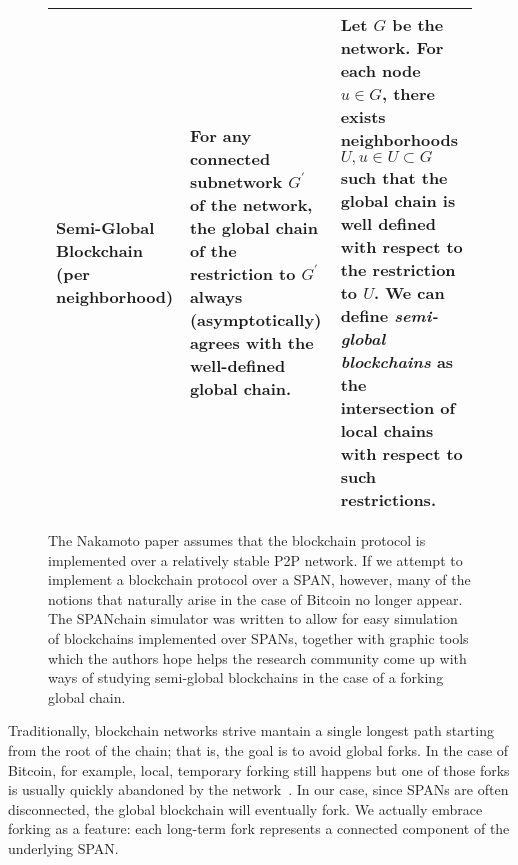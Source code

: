 \begin{figure*}[t]
\begin{tabular}{|p{3cm}||p{6.7cm}|p{6.7cm}|}
		\raggedright
		\textbf{Semi-Global Blockchain (per neighborhood)} &
			For any connected subnetwork $G^\prime$ of the network, the
			global chain of the restriction to $G^\prime$ always
			(asymptotically) agrees with the well-defined global
			chain.
			&
			Let $G$ be the network. For each node $u\in G$, there exists
			neighborhoods $U,u\in U\subset G$ such that the global
			chain is well defined with respect to the restriction
			to $U$. We can define \textit{semi-global blockchains}
			as the intersection of local chains with respect to
			such restrictions.
			\\
		\hline
	\end{tabular}
	\caption{The Nakamoto paper assumes that the blockchain protocol is
		implemented over a relatively stable P2P network. If we attempt to
		implement a blockchain protocol over a SPAN, however, many of the
		notions that naturally arise in the case of Bitcoin no longer appear.
		The SPANchain simulator was written to allow for easy simulation of 
		blockchains implemented over SPANs, together with graphic tools which
		the authors hope helps the research community come up with ways
		of studying semi-global blockchains in the case of a forking global chain.}
	\label{tab:three_table}
\end{figure*}

Traditionally,
blockchain networks strive mantain a single longest path
starting from the root of the chain;
that is,
the goal is to avoid global forks.
In the case of Bitcoin,
for example,
local, temporary forking still happens
but one of those forks is usually quickly abandoned by the network~\cite{decker_2013}.
In our case,
since SPANs are often disconnected,
the global blockchain will eventually fork.
We actually embrace forking as a feature:
each long-term fork represents a connected component of the underlying SPAN.
